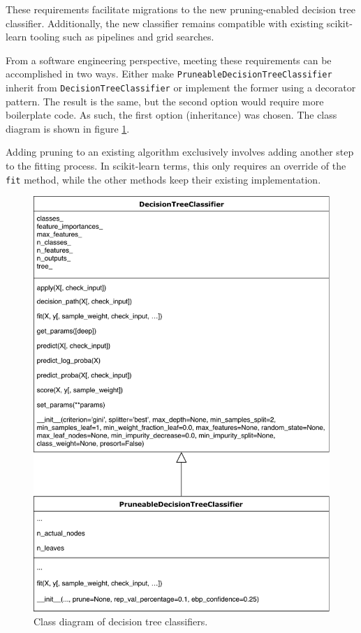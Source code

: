 These requirements facilitate migrations to the new pruning-enabled decision tree classifier. Additionally, the new classifier remains compatible with existing scikit-learn tooling such as pipelines and grid searches.

From a software engineering perspective, meeting these requirements can be accomplished in two ways. Either make \texttt{PruneableDecisionTreeClassifier} inherit from \texttt{DecisionTreeClassifier} or implement the former using a decorator pattern. The result is the same, but the second option would require more boilerplate code. As such, the first option (inheritance) was chosen. The class diagram is shown in figure \ref{fig:classifier_classes}.

Adding pruning to an existing algorithm exclusively involves adding another step to the fitting process. In scikit-learn terms, this only requires an override of the \texttt{fit} method, while the other methods keep their existing implementation.

\begin{figure}[htp]
    \centering
    \includegraphics[width=\textwidth]{img/DecisionTreeClasses.pdf}
    \caption{Class diagram of decision tree classifiers.}%
    \label{fig:classifier_classes}
\end{figure}

